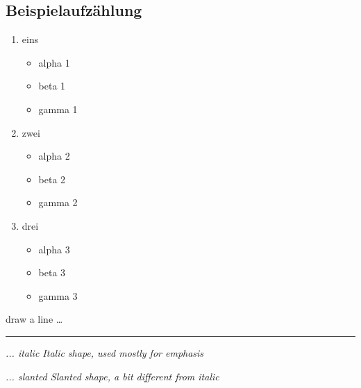 
\subsection{Beispielaufzählung}

\begin{enumerate}

    \item eins
        \begin{itemize}
            \item 	alpha 1
            \item   beta 1
            \item 	gamma 1
        \end{itemize}

    \item zwei
        \begin{itemize}
            \item 	alpha 2
            \item   beta 2
            \item 	gamma 2
        \end{itemize}

    \item drei
        \begin{itemize}
            \item 	alpha 3
            \item   beta 3
            \item 	gamma 3
        \end{itemize}

\end{enumerate}

draw a line \dots

\rule{\textwidth}{1pt} %

\textit{... italic Italic shape, used mostly for emphasis}

\textsl{... slanted Slanted shape, a bit different from italic}

